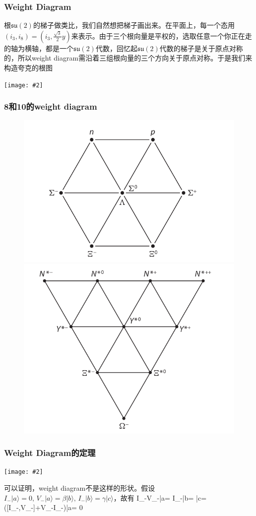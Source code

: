 \documentclass[CJK]{beamer}
\newcommand{\su}{\mathfrak{su}}
\newcommand{\cpic}[2]{
\begin{center}
\texttt{[image: \#2]}
\end{center}
}
\begin{document}
\begin{frame}\frametitle{Weight Diagram}
  根$\su(2)$的梯子做类比，我们自然想把梯子画出来。在平面上，每一个态用$(i_3,i_8) =(i_3,\frac{\sqrt{3}}{2}y)$来表示。由于三个根向量是平权的，选取任意一个你正在走的轴为横轴，都是一个$\su(2)$代数，回忆起$\su(2)$代数的梯子是关于原点对称的，所以weight diagram需沿着三组根向量的三个方向关于原点对称。于是我们来构造夸克的根图
  \cpic{0.2}{quark}
\end{frame}
\begin{frame}\frametitle{8和10的weight diagram}
  \begin{figure}
\includegraphics[scale=0.2]{eight}
\includegraphics[scale=0.2]{ten}
\end{figure}
\end{frame}
\begin{frame}\frametitle{Weight Diagram的定理}
  \cpic{0.2}{weight}
  可以证明，weight diagram不是这样的形状。假设$I_-|a\rangle =0,\,V_-|a\rangle = \beta |b\rangle,\,I_-|b\rangle = \gamma |c\rangle$，故有
  \be
  I_-V_-|a\rangle = \beta I_-|b\rangle = \beta\gamma |c\rangle = ([I_-,V_-]+V_-I_-)|a\rangle = 0
  \ee
\end{frame}
\end{document}
